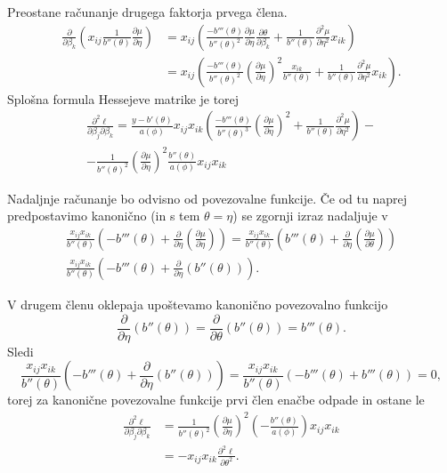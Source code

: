 \documentclass[12pt,a4paper]{amsart}
\theoremstyle{definition} %
\theoremstyle{plain} %
\begin{document}
Preostane računanje drugega faktorja prvega člena.
\begin{align*}
    \frac{\partial}{\partial\beta_{k}}\left(x_{ij}\frac{1}{b''(\theta)}\frac{\partial\mu}{\partial\eta}\right) &= x_{ij}\left(\frac{-b'''(\theta)}{b''(\theta)^2}\frac{\partial\mu}{\partial\eta}\frac{\partial\theta}{\partial\beta_{k}}
    +\frac{1}{b''(\theta)}\frac{\partial^2\mu}{\partial\eta^2}x_{ik}\right) \\
    &= x_{ij}\left(\frac{-b'''(\theta)}{b''(\theta)^2}\left(\frac{\partial\mu}{\partial\eta}\right)^2\frac{x_{ik}}{b''(\theta)} +
    \frac{1}{b''(\theta)}\frac{\partial^2\mu}{\partial\eta^2}x_{ik}\right).
\end{align*}
Splošna formula Hessejeve matrike je torej
\begin{multline}\label{splosniHesse}
    \frac{\partial^2\ell}{\partial\beta_{j}\partial\beta_{k}} = \frac{y-b'(\theta)}{a(\phi)} x_{ij}x_{ik}\left(\frac{-b'''(\theta)}{b''(\theta)^3}\left(\frac{\partial\mu}{\partial\eta}\right)^2 +
    \frac{1}{b''(\theta)}\frac{\partial^2\mu}{\partial\eta^2}\right) - \\
    -\frac{1}{b''(\theta)^2}\left(\frac{\partial\mu}{\partial\eta}\right)^2\frac{b''(\theta)}{a(\phi)}x_{ij}x_{ik}
\end{multline}

Nadaljnje računanje bo odvisno od povezovalne funkcije. Če od tu naprej predpostavimo kanonično (in s tem $\theta = \eta$) se zgornji izraz nadaljuje v
\begin{multline*}
    \frac{x_{ij}x_{ik}}{b''(\theta)}\left(-b'''(\theta) + \frac{\partial}{\partial\eta}\left(\frac{\partial\mu}{\partial\eta}\right) \right) = \frac{x_{ij}x_{ik}}{b''(\theta)}\left(b'''(\theta) + \frac{\partial}{\partial\eta}\left(\frac{\partial\mu}{\partial\theta}\right) \right) \\
    \frac{x_{ij}x_{ik}}{b''(\theta)}\left(-b'''(\theta) + \frac{\partial}{\partial\eta}\left(b''(\theta)\right) \right).
\end{multline*}

V drugem členu oklepaja upoštevamo kanonično povezovalno funkcijo
\[
    \frac{\partial}{\partial\eta}(b''(\theta)) = \frac{\partial}{\partial\theta}(b''(\theta)) = b'''(\theta).
\]
Sledi
\[
    \frac{x_{ij}x_{ik}}{b''(\theta)}\left(-b'''(\theta) + \frac{\partial}{\partial\eta}\left(b''(\theta)\right) \right) = \frac{x_{ij}x_{ik}}{b''(\theta)}\left(-b'''(\theta) + b'''(\theta) \right) = 0,
\]
torej za kanonične povezovalne funkcije prvi člen enačbe  odpade in ostane le
\begin{align}
    \frac{\partial^2\ell}{\partial\beta_{j}\partial\beta_{k}} &= \frac{1}{b''(\theta)^2}\left(\frac{\partial\mu}{\partial\eta}\right)^2\left(-\frac{b''(\theta)}{a(\phi)}\right)x_{ij}x_{ik} \\
    &=-x_{ij}x_{ik}\frac{\partial^2\ell}{\partial\theta^2}.
\end{align}
\end{document}

